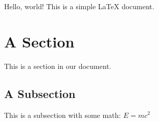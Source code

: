 \documentclass{article}
\begin{document}
Hello, world! This is a simple LaTeX document.

\section{A Section}
This is a section in our document.

\subsection{A Subsection}
This is a subsection with some math: $E = mc^2$
\end{document}
